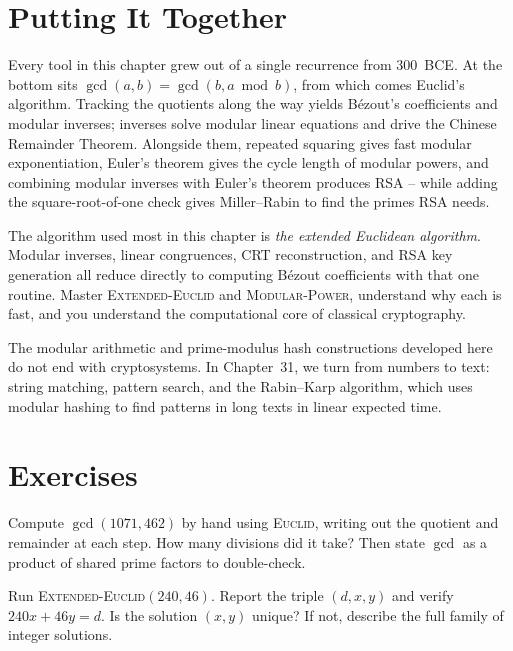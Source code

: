 \section{Putting It Together}
\label{ch30:together}

Every tool in this chapter grew out of a single recurrence from 300~BCE. At the
bottom sits $\gcd(a,b) = \gcd(b, a \bmod b)$, from which comes Euclid's
algorithm. Tracking the quotients along the way yields B\'ezout's coefficients
and modular inverses; inverses solve modular linear equations and drive the
Chinese Remainder Theorem. Alongside them, repeated squaring gives fast modular
exponentiation, Euler's theorem gives the cycle length of modular powers, and
combining modular inverses with Euler's theorem produces RSA -- while adding the
square-root-of-one check gives Miller--Rabin to find the primes RSA needs.

\begin{focusbox}
The algorithm used most in this chapter is \emph{the extended
Euclidean algorithm}. Modular inverses, linear congruences, CRT reconstruction,
and RSA key generation all reduce directly to computing B\'ezout coefficients
with that one routine. Master \textsc{Extended-Euclid}
and \textsc{Modular-Power}, understand why each is fast, and you understand the
computational core of classical cryptography.
\end{focusbox}

The modular arithmetic and prime-modulus hash constructions developed here do not end with cryptosystems. In Chapter~31, we turn from numbers to text: string matching, pattern search, and the Rabin--Karp algorithm, which uses modular hashing to find patterns in long texts in linear expected time.

\section*{Exercises}

\begin{exercise}
\label{ch30:ex-trace}
Compute $\gcd(1071, 462)$ by hand using \textsc{Euclid}, writing out the
quotient and remainder at each step. How many divisions did it take? Then state
$\gcd$ as a product of shared prime factors to double-check.
\end{exercise}

\begin{exercise}
\label{ch30:ex-bezout}
Run \textsc{Extended-Euclid}$(240, 46)$. Report the triple $(d, x, y)$ and verify
$240x + 46y = d$. Is the solution $(x,y)$ unique? If not, describe the full
family of integer solutions.
\end{exercise}

